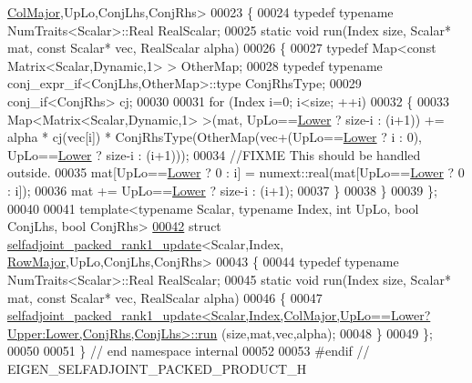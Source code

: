 \begin{DoxyCode}
      \hyperlink{group__enums_ggaacded1a18ae58b0f554751f6cdf9eb13a0cbd4bdd0abcfc0224c5fcb5e4f6669a}{ColMajor},UpLo,ConjLhs,ConjRhs>
00023 \{
00024   \textcolor{keyword}{typedef} \textcolor{keyword}{typename} NumTraits<Scalar>::Real RealScalar;
00025   \textcolor{keyword}{static} \textcolor{keywordtype}{void} run(Index size, Scalar* mat, \textcolor{keyword}{const} Scalar* vec, RealScalar alpha)
00026   \{
00027     \textcolor{keyword}{typedef} Map<const Matrix<Scalar,Dynamic,1> > OtherMap;
00028     \textcolor{keyword}{typedef} \textcolor{keyword}{typename} conj\_expr\_if<ConjLhs,OtherMap>::type ConjRhsType;
00029     conj\_if<ConjRhs> cj;
00030 
00031     \textcolor{keywordflow}{for} (Index i=0; i<size; ++i)
00032     \{
00033       Map<Matrix<Scalar,Dynamic,1> >(mat, UpLo==\hyperlink{group__enums_gga39e3366ff5554d731e7dc8bb642f83cda891792b8ed394f7607ab16dd716f60e6}{Lower} ? size-i : (i+1)) += alpha * cj(vec[i]) * 
      ConjRhsType(OtherMap(vec+(UpLo==\hyperlink{group__enums_gga39e3366ff5554d731e7dc8bb642f83cda891792b8ed394f7607ab16dd716f60e6}{Lower} ? i : 0), UpLo==\hyperlink{group__enums_gga39e3366ff5554d731e7dc8bb642f83cda891792b8ed394f7607ab16dd716f60e6}{Lower} ? size-i : (i+1)));
00034       \textcolor{comment}{//FIXME This should be handled outside.}
00035       mat[UpLo==\hyperlink{group__enums_gga39e3366ff5554d731e7dc8bb642f83cda891792b8ed394f7607ab16dd716f60e6}{Lower} ? 0 : i] = numext::real(mat[UpLo==\hyperlink{group__enums_gga39e3366ff5554d731e7dc8bb642f83cda891792b8ed394f7607ab16dd716f60e6}{Lower} ? 0 : i]);
00036       mat += UpLo==\hyperlink{group__enums_gga39e3366ff5554d731e7dc8bb642f83cda891792b8ed394f7607ab16dd716f60e6}{Lower} ? size-i : (i+1);
00037     \}
00038   \}
00039 \};
00040 
00041 \textcolor{keyword}{template}<\textcolor{keyword}{typename} Scalar, \textcolor{keyword}{typename} Index, \textcolor{keywordtype}{int} UpLo, \textcolor{keywordtype}{bool} ConjLhs, \textcolor{keywordtype}{bool} ConjRhs>
\hyperlink{structinternal_1_1selfadjoint__packed__rank1__update_3_01_scalar_00_01_index_00_01_row_major_00_9e7850f711875a82e66e0710a9772df5}{00042} \textcolor{keyword}{struct }\hyperlink{structinternal_1_1selfadjoint__packed__rank1__update}{selfadjoint\_packed\_rank1\_update}<Scalar,Index,
      \hyperlink{group__enums_ggaacded1a18ae58b0f554751f6cdf9eb13acfcde9cd8677c5f7caf6bd603666aae3}{RowMajor},UpLo,ConjLhs,ConjRhs>
00043 \{
00044   \textcolor{keyword}{typedef} \textcolor{keyword}{typename} NumTraits<Scalar>::Real RealScalar;
00045   \textcolor{keyword}{static} \textcolor{keywordtype}{void} run(Index size, Scalar* mat, \textcolor{keyword}{const} Scalar* vec, RealScalar alpha)
00046   \{
00047     
      \hyperlink{structinternal_1_1selfadjoint__packed__rank1__update}{selfadjoint\_packed\_rank1\_update<Scalar,Index,ColMajor,UpLo==Lower?Upper:Lower,ConjRhs,ConjLhs>::run}
      (size,mat,vec,alpha);
00048   \}
00049 \};
00050 
00051 \} \textcolor{comment}{// end namespace internal}
00052 
00053 \textcolor{preprocessor}{#endif // EIGEN\_SELFADJOINT\_PACKED\_PRODUCT\_H}
\end{DoxyCode}

